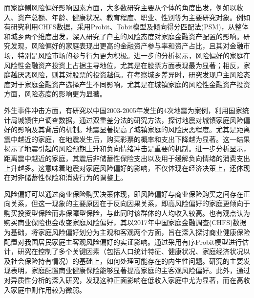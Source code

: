 而家庭侧风险偏好影响因素方面，大多数研究主要从个体的角度出发，例如以收入\citep{石双2018收入与风险偏好}、资产总额\citep{卢亚娟殷君瑶2021户主风险态度对家庭金融资产配置的影响研究}、年龄\citep{王晶2021年龄结构}、健康状况\citep{雷晓燕2010中国家庭的资产组合选择}、教育程度\citep{梁立俊2018受教育程度与主客观风险偏好}、职业\citep{赵颖2017中国劳动者的风险偏好与职业选择}、性别\citep{徐小华2019女性劳动参与会影响家庭资产配置风险偏好吗}等为主要研究对象。例如有研究利用CHFS数据，采用Probit、Tobit模型及倾向得分匹配法(PSM)，从整体和城乡两个维度出发，深入研究了户主的风险态度对家庭金融资产配置的影响\citep{卢亚娟殷君瑶2021户主风险态度对家庭金融资产配置的影响研究}。研究发现，风险偏好的家庭表现出更高的金融资产参与率和资产占比，且其对金融市场，特别是风险市场的参与行为更为积极。进一步的分析揭示，风险偏好的家庭在风险性金融资产投资上占据主导地位，尤其是在股票方面表现最为显著；相反，家庭越厌恶风险，则其对股票的投资越低。在考察城乡差异时，研究发现户主风险态度对于家庭金融资产选择产生不同影响，尤其是在城镇家庭的风险性金融资产投资方面，风险态度的影响更为显著。

外生事件冲击方面，有研究以中国2003-2005年发生的4次地震为案例，利用国家统计局城镇住户调查数据，通过双重差分法的研究方法，探讨地震对城镇家庭风险偏好的影响及其背后的机制\citep{章元0地震冲击对风险偏好的影响}。地震显著提高了城镇家庭的风险厌恶程度。尤其是距离震中越近的家庭，在地震发生后，购买彩票的概率和支出下降越为显著。这一结果揭示了地震引起的风险预期上升和负向情绪冲击是重要的机制。进一步分析显示，距离震中越近的家庭，其震后非储蓄性保险支出以及用于缓解负向情绪的消费支出上升越多。这意味着地震对家庭风险偏好的影响，不仅体现在经济决策上，还体现在对非储蓄性保险和消费行为的调整上。

风险偏好可以通过商业保险购买决策体现，即风险偏好与商业保险购买之间存在正向关系\citep{宋章良2021我国中老年家庭风险偏好对商业保险购买行为的影响研究}，但这一现象的主要原因在于反向因果关系，即高风险偏好的家庭更倾向于购买投资型保险而非保障型保险，与此同时该群体的人均收入较高。也有观点认为购买商业保险也会改变家庭风险偏好\citep{孙武军2023商业健康保险的配置能够改变家庭的风险偏好吗}，其以2017年中国家庭金融调查(CHFS)数据为基础，将家庭风险偏好划分为主观和客观两个方面，旨在深入探讨商业健康保险配置对我国居民家庭主客观风险偏好的实证影响。通过采用有序Probit模型进行估计，研究在控制了多个关键因素（包括人口统计特征、健康状况、家庭经济状况以及社会保险持有情况）的基础上，如何处理可能存在的内生性问题。研究的主要发现表明，家庭配置商业健康保险能够显著提高家庭的主客观风险偏好。此外，通过对异质性分析的深入研究，发现这种正面影响在低收入家庭中尤为显著，而在高收入家庭中则作用较为微弱。

